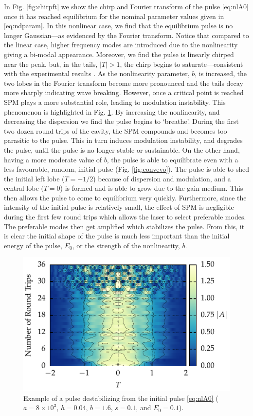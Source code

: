 \documentclass[9pt,twocolumn,twoside]{osajnl}
\begin{document}
In Fig. \ref{fig:chirpft} we show the chirp and Fourier transform of the pulse \eqref{eq:nlA0} once it has reached equilibrium for the nominal parameter values given in \eqref{eq:ndparam}. In this nonlinear case, we find that the equilibrium pulse is no longer Gaussian---as evidenced by the Fourier transform. Notice that compared to the linear case, higher frequency modes are introduced due to the nonlinearity giving a bi-modal appearance. Moreover, we find the pulse is linearly chirped near the peak, but, in the tails, $|T| > 1$, the chirp begins to saturate---consistent with the experimental results \cite{chen2008, rothenberg1989b, tomlinson1985}. As the nonlinearity parameter, $b$, is increased, the two lobes in the Fourier transform become more pronounced and the tails decay more sharply indicating wave breaking. However, once a critical point is reached SPM plays a more substantial role, leading to modulation instability. This phenomenon is highlighted in Fig. \ref{fig:breakevo}. By increasing the nonlinearity, and decreasing the dispersion we find the pulse begins to `breathe'. During the first two dozen round trips of the cavity, the SPM compounds and becomes too parasitic to the pulse. This in turn induces modulation instability, and degrades the pulse, until the pulse is no longer stable or sustainable. On the other hand, having a more moderate value of $b$, the pulse is able to equilibrate even with a less favourable, random, initial pulse (Fig. \ref{fig:convevo}). The pulse is able to shed the initial left lobe ($T = -1 / 2$) because of dispersion and modulation, and a central lobe ($T = 0$) is formed and is able to grow due to the gain medium. This then allows the pulse to come to equilibrium very quickly. Furthermore, since the intensity of the initial pulse is relatively small, the effect of SPM is negligible during the first few round trips which allows the laser to select preferable modes. The preferable modes then get amplified which stabilizes the pulse. From this, it is clear the initial shape of the pulse is much less important than the initial energy of the pulse, $E_0$, or the strength of the nonlinearity, $b$.

\begin{figure}[tbp]
	\centering
	\includegraphics{Figures/Break}
	\caption{Example of a pulse destabilizing from the initial pulse \eqref{eq:nlA0} ($a = 8 \times 10^3$, $h = 0.04$, $b = 1.6$, $s = 0.1$, and $E_0 = 0.1$).}
	\label{fig:breakevo}
\end{figure}
\end{document}
